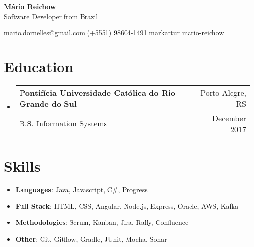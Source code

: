 \documentclass[letterpaper,11pt]{article}
\makeatletter
\newcommand{\resumeItem}[2]{
  \item\small{
    \textbf{#1}{: #2 \vspace{-2pt}}
  }
}
\newcommand{\resumeSubheading}[4]{
  \vspace{-1pt}\item
    \begin{tabular*}{0.98\textwidth}[t]{l@{\extracolsep{\fill}}r}
      \textbf{#1} & #2 \\
      {\small#3} & {\small #4} \\
    \end{tabular*}\vspace{-5pt}
}
\newcommand{\resumeSubItem}[2]{\resumeItem{#1}{#2}\vspace{-4pt}}
\renewcommand{\labelitemi}{}
\newcommand{\resumeSubHeadingListStart}{\begin{itemize}[leftmargin=*]}
\newcommand{\resumeSubHeadingListEnd}{\end{itemize}}
\makeatother
\begin{document}

\textbf{\LARGE Mário Reichow}\\
Software Developer from Brazil\\\vspace{\baselineskip}

{\Centering %

\raisebox{-0.20\height}{\Large \faInbox} \space \href{mailto:mario.dornelles@gmail.com}{mario.dornelles@gmail.com} \hfill %
\raisebox{-0.20\height}{\Large \faPhone} \space (+5551) 98604-1491 \hfill %
\raisebox{-0.20\height}{\Large \faGithub} \space \href{https://github.com/markartur}{markartur} \hfill %
\raisebox{-0.20\height}{\Large \faLinkedinSquare} \space \href{https://www.linkedin.com/in/mario-reichow/}{mario-reichow} %
} %


\section{Education}
  \resumeSubHeadingListStart
    \resumeSubheading
      {Pontifícia Universidade Católica do Rio Grande do Sul}{Porto Alegre, RS}
      {B.S. Information Systems}{December 2017}	
  \resumeSubHeadingListEnd



\section{Skills}
  \resumeSubHeadingListStart
    \resumeSubItem{Languages}
      {Java, Javascript, C\#, Progress}
    \resumeSubItem{Full Stack}
      {HTML, CSS, Angular, Node.js, Express, Oracle, AWS, Kafka}
    \resumeSubItem{Methodologies}
      {Scrum, Kanban, Jira, Rally, Confluence } 
    \resumeSubItem{Other}
      {Git, Gitflow, Gradle, JUnit, Mocha, Sonar}
  \resumeSubHeadingListEnd

\renewcommand{\labelitemi}{}

\end{document}
